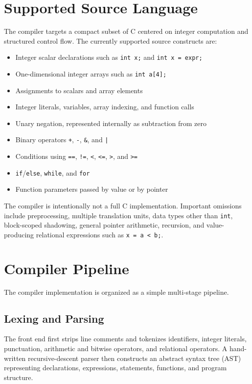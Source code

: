 \documentclass[12pt]{report}
\begin{document}
\section{Supported Source Language}

The compiler targets a compact subset of C centered on integer computation and
structured control flow. The currently supported source constructs are:

\begin{itemize}
    \item Integer scalar declarations such as \texttt{int x;} and
          \texttt{int x = expr;}
    \item One-dimensional integer arrays such as \texttt{int a[4];}
    \item Assignments to scalars and array elements
    \item Integer literals, variables, array indexing, and function calls
    \item Unary negation, represented internally as subtraction from zero
    \item Binary operators \texttt{+}, \texttt{-}, \texttt{\&}, and \texttt{|}
    \item Conditions using \texttt{==}, \texttt{!=}, \texttt{<},
          \texttt{<=}, \texttt{>}, and \texttt{>=}
    \item \texttt{if}/\texttt{else}, \texttt{while}, and \texttt{for}
    \item Function parameters passed by value or by pointer
\end{itemize}

The compiler is intentionally not a full C implementation. Important omissions
include preprocessing, multiple translation units, data types other than
\texttt{int}, block-scoped shadowing, general pointer arithmetic, recursion,
and value-producing relational expressions such as \texttt{x = a < b;}.

\section{Compiler Pipeline}

The compiler implementation is organized as a simple multi-stage pipeline.

\subsection{Lexing and Parsing}

The front end first strips line comments and tokenizes identifiers, integer
literals, punctuation, arithmetic and bitwise operators, and relational
operators. A hand-written recursive-descent parser then constructs an abstract
syntax tree (AST) representing declarations, expressions, statements,
functions, and program structure.
\end{document}

